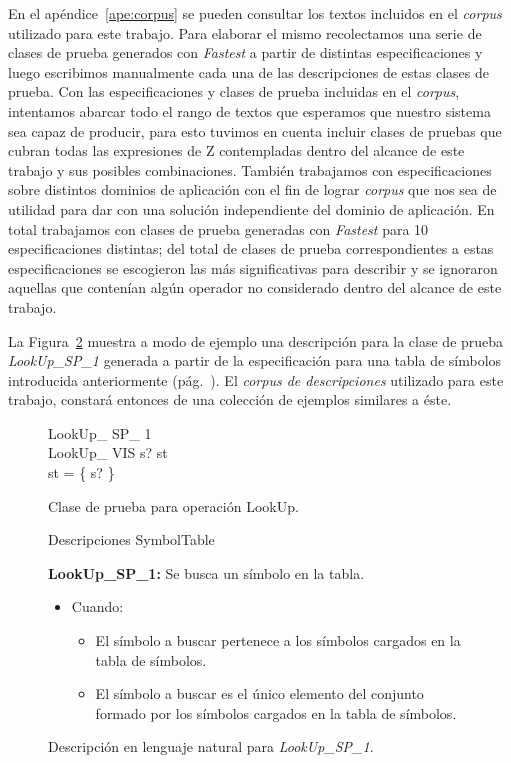 En el apéndice~\ref{ape:corpus} se pueden consultar los textos incluidos en el \emph{corpus} utilizado para este trabajo. Para elaborar el mismo recolectamos una serie de clases de prueba generados con \emph{Fastest} a partir de distintas especificaciones y luego escribimos manualmente cada una de las descripciones de estas clases de prueba. Con las especificaciones y clases de prueba incluidas en el \emph{corpus}, intentamos abarcar todo el rango de textos que esperamos que nuestro sistema sea capaz de producir, para esto tuvimos en cuenta incluir clases de pruebas que cubran todas las expresiones de Z contempladas dentro del alcance de este trabajo y sus posibles combinaciones. También trabajamos con especificaciones sobre distintos dominios de aplicación con el fin de lograr \emph{corpus} que nos sea de utilidad para dar con una solución independiente del dominio de aplicación. En total trabajamos con clases de prueba generadas con \emph{Fastest} para 10 especificaciones distintas; del total de clases de prueba correspondientes a estas especificaciones se escogieron las más significativas para describir y se ignoraron aquellas que contenían algún operador no considerado dentro del alcance de este trabajo.

La Figura~\ref{fig:ej_desc_lookup_sp_1} muestra a modo de ejemplo una descripción para la clase de prueba \emph{LookUp\_SP\_1} generada a partir de la especificación para una tabla de símbolos introducida anteriormente (pág.~\pageref{fig:spec_symbol_table}). 
El \emph{corpus de descripciones} utilizado para este trabajo, constará entonces de una colección de ejemplos similares a éste.

\begin{figure}[H]
  \centering
   \begin{schema}{LookUp\_ SP\_ 1}\\
  		LookUp\_ VIS 
  		\where
  	 	s? \in \dom st \\
 		\dom st = \{ s? \}
  	\end{schema}
  \caption{Clase de prueba para operación LookUp.}
  \label{fig:ej_lookup_sp_1}
\end{figure}

\begin{figure}[H]
Descripciones SymbolTable 

\bigskip
\textbf{LookUp\_SP\_1:} Se busca un símbolo en la tabla.  
  \begin{itemize}
   \item{Cuando:}
   \begin{itemize}
  	  \item{El símbolo a buscar pertenece a los símbolos cargados en la tabla de símbolos.}
  	  \item{El símbolo a buscar es el único elemento del conjunto formado por los símbolos cargados en la tabla de símbolos.}   
   \end{itemize}
  \end{itemize}
  \caption{Descripción en lenguaje natural para \emph{LookUp\_SP\_1}.}
  \label{fig:ej_desc_lookup_sp_1}
\end{figure}


